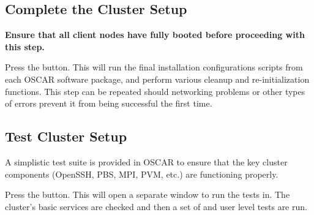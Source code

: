 
\subsection{Complete the Cluster Setup}
\label{det:complete-cluster-setup}

{\bf Ensure that all client nodes have fully booted before proceeding
  with this step.}

Press the  button.  This will run the
final installation configurations scripts from each OSCAR software
package, and perform various cleanup and re-initialization
functions.  This step can be repeated should networking problems or
other types of errors prevent it from being successful the first
time.



\subsection{Test Cluster Setup}
\label{det:test-cluster}

A simplistic test suite is provided in OSCAR to ensure that the key
cluster components (OpenSSH, PBS, MPI, PVM, etc.) are functioning
properly.

Press the  button. This will open a
separate window to run the tests in.  The cluster's basic services are
checked and then a set of  and user level tests are run.

